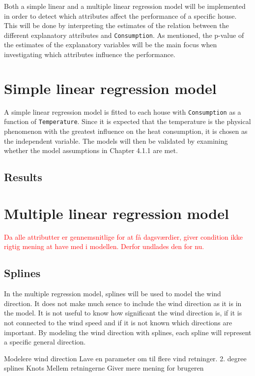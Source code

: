\noindent Both a simple linear and a multiple linear regression model will be implemented in order to detect which attributes affect the performance of a specific house. This will be done by interpreting the estimates of the relation between the different explanatory attributes and \texttt{Consumption}. As mentioned, the p-value of the estimates of the explanatory variables will be the main focus when investigating which attributes influence the performance. 

\section{Simple linear regression model}
A simple linear regression model is fitted to each house with \texttt{Consumption} as a function of \texttt{Temperature}. Since it is expected that the temperature is the physical phenomenon with the greatest influence on the heat consumption, it is chosen as the independent variable. The models will then be validated by examining whether the model assumptions in Chapter 4.1.1 are met. \\

\noindent 


\subsection{Results}

\section{Multiple linear regression model}

\textcolor{red}{Da alle attributter er gennemsnitlige for at få dagsværdier, giver condition ikke rigtig mening at have med i modellen. Derfor undlades den for nu.}

\subsection{Splines}
In the multiple regression model, splines will be used to model the wind direction. It does not make much sence to include the wind direction as it is in the model. It is not useful to know how significant the wind direction is, if it is not connected to the wind speed and if it is not known which directions are important. By modeling the wind direction with splines, each spline will represent a specific general direction.


Modelere wind direction
Lave en parameter om til flere vind retninger.
2. degree splines
Knots
Mellem retningerne
Giver mere mening for brugeren

